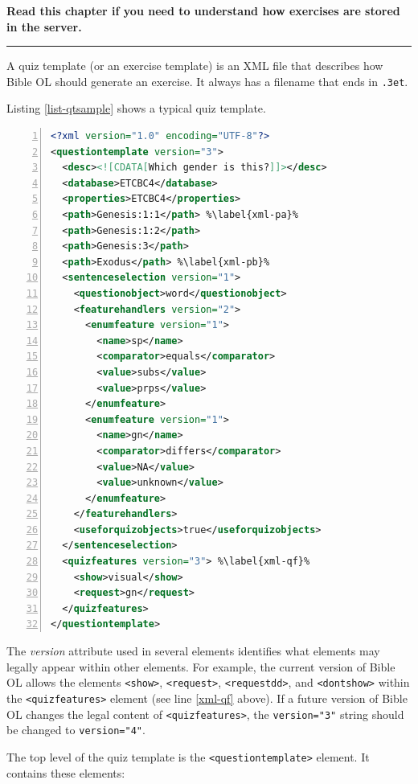 \documentclass[11pt,oneside,a4paper]{memoir}
\newcommand*{\xml}[1]{\texttt{<#1>}}
\newcommand*{\xmla}[1]{\texttt{#1}} %
\begin{document}
\textbf{Read this chapter if you need to understand how exercises are stored in the server.}
\plainbreak{3}


A quiz template (or an exercise template) is an XML
file that describes how Bible OL should generate an exercise. It always has a filename that ends in
\texttt{.3et}.

Listing \ref{list-qtsample} shows a typical quiz template.

\begin{lstlisting}[language=XML,numbers=left,caption=Quiz template sample,label=list-qtsample]
<?xml version="1.0" encoding="UTF-8"?>
<questiontemplate version="3">
  <desc><![CDATA[Which gender is this?]]></desc>
  <database>ETCBC4</database>
  <properties>ETCBC4</properties>
  <path>Genesis:1:1</path> %\label{xml-pa}%
  <path>Genesis:1:2</path>
  <path>Genesis:3</path>
  <path>Exodus</path> %\label{xml-pb}%
  <sentenceselection version="1">
    <questionobject>word</questionobject>
    <featurehandlers version="2">
      <enumfeature version="1">
        <name>sp</name>
        <comparator>equals</comparator>
        <value>subs</value>
        <value>prps</value>
      </enumfeature>
      <enumfeature version="1">
        <name>gn</name>
        <comparator>differs</comparator>
        <value>NA</value>
        <value>unknown</value>
      </enumfeature>
    </featurehandlers>
    <useforquizobjects>true</useforquizobjects>
  </sentenceselection>
  <quizfeatures version="3"> %\label{xml-qf}%
    <show>visual</show>
    <request>gn</request>
  </quizfeatures>
</questiontemplate>
\end{lstlisting}

The \emph{version} attribute used in several elements identifies what elements may legally appear
within other elements. For example, the current version of Bible OL allows the elements \xml{show},
\xml{request}, \xml{requestdd}, and \xml{dontshow} within the \xml{quizfeatures} element (see line
\ref{xml-qf} above). If a future version of Bible OL changes the legal content of
\xml{quizfeatures}, the \xmla{version="3"} string should be changed to \xmla{version="4"}.


The top level of the quiz template is the \xml{questiontemplate} element. It contains these
elements:
\end{document}
